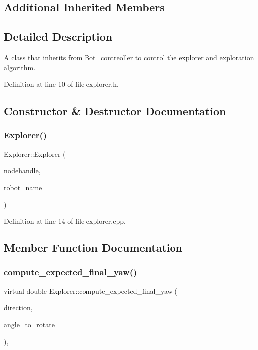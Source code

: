 \subsection*{Additional Inherited Members}


\subsection{Detailed Description}
A class that inherits from Bot\+\_\+contreoller to control the explorer and exploration algorithm. 

Definition at line 10 of file explorer.\+h.



\subsection{Constructor \& Destructor Documentation}
\mbox{\label{class_explorer_aafe6b7c3b9c2e24815aa14a731f31890}} 
\subsubsection{\texorpdfstring{Explorer()}{Explorer()}}
{\footnotesize\ttfamily Explorer\+::\+Explorer (\begin{DoxyParamCaption}\item[{ros\+::\+Node\+Handle $\ast$}]{nodehandle,  }\item[{const std\+::string \&}]{robot\+\_\+name }\end{DoxyParamCaption})}



Definition at line 14 of file explorer.\+cpp.



\subsection{Member Function Documentation}
\mbox{\label{class_explorer_a5a445fc280b6fb133e1ce02e09920da2}} 
\subsubsection{\texorpdfstring{compute\+\_\+expected\+\_\+final\+\_\+yaw()}{compute\_expected\_final\_yaw()}}
{\footnotesize\ttfamily virtual double Explorer\+::compute\+\_\+expected\+\_\+final\+\_\+yaw (\begin{DoxyParamCaption}\item[{bool}]{direction,  }\item[{double}]{angle\+\_\+to\+\_\+rotate }\end{DoxyParamCaption})\hspace{0.3cm}{\ttfamily [override]}, {\ttfamily [virtual]}}



